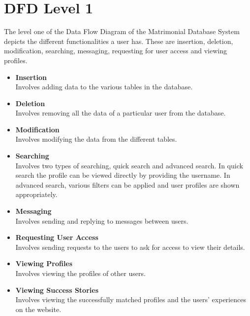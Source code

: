 \documentclass[12pt]{report}
\begin{document}
\section{DFD Level 1}

The level one of the Data Flow Diagram of the Matrimonial Database System depicts the different functionalities a user has. These are insertion, deletion, modification, searching, messaging, requesting for user access and viewing profiles.

\begin{itemize}
\item\textbf{Insertion} \\ Involves adding data to the various tables in the database.

\item\textbf{Deletion} \\Involves removing all the data of a particular user from the database.  

\item\textbf{Modification} \\Involves modifying the data from the different tables.

\item\textbf{Searching} \\Involves two types of searching, quick search and advanced search. In quick search the profile can be viewed directly by providing the username. In advanced search, various filters can be applied and user profiles are shown appropriately. 

\item\textbf{Messaging} \\Involves sending and replying to messages between users. 

\item\textbf{Requesting User Access } \\ Involves sending requests to the users to ask for access to view their details. 

\item\textbf{Viewing Profiles } \\ Involves viewing the profiles of other users. 

\item\textbf{Viewing Success Stories } \\ Involves viewing the successfully matched profiles and the users' experiences on the website. 


\end{itemize}

 
\end{document}

